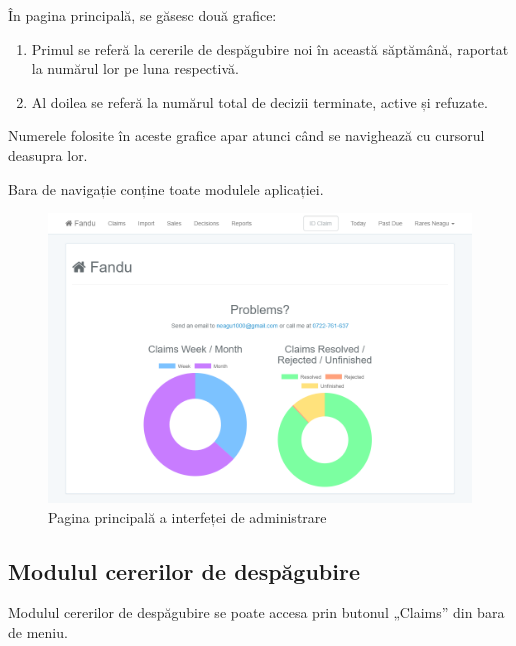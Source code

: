 	În pagina principală, se găsesc două grafice:
	\begin{enumerate}
		\item Primul se referă la cererile de despăgubire noi în această săptămână, raportat la numărul lor pe luna respectivă.
		\item Al doilea se referă la numărul total de decizii terminate, active și refuzate.
	\end{enumerate}

	Numerele folosite în aceste grafice apar atunci când se navighează cu cursorul deasupra lor.

	Bara de navigație conține toate modulele aplicației.

	\begin{figure}
		\includegraphics[width=\linewidth]{../imagini/home_page.png}
		\caption{Pagina principală a interfeței de administrare}
		\label{fig:home_page}
	\end{figure}

	\subsection{Modulul cererilor de despăgubire}

	Modulul cererilor de despăgubire se poate accesa prin butonul „Claims” din bara de meniu.


